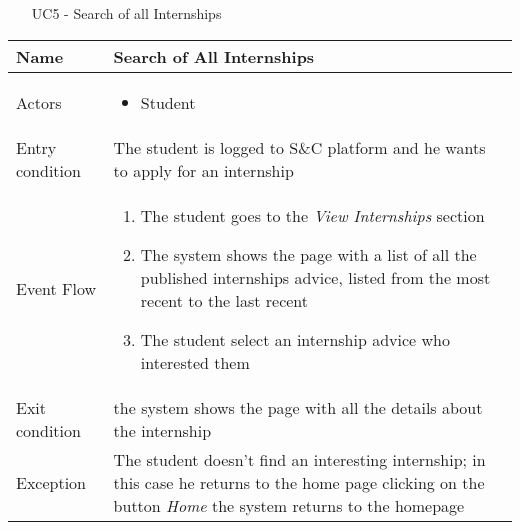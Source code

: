 				\begin{table} [H]
					\centering
					\begin{itemize}
						\item [UC5] - Search of all Internships
					\end{itemize}
					\begin{tabular}{|| P{7.5cm} | P{7.5cm} ||}
						\hline
						Name & Search of All Internships \\
						\hline
						Actors & \parbox{5cm}{\begin{itemize}
								\item Student
							\end{itemize}
						} \\
						\hline
						Entry condition & The student is logged to S\&C platform and he wants to apply for an internship  \\
						\hline
						Event Flow & \parbox{5cm}{\begin{enumerate}
								\item The student goes to the \textit{View 
									Internships} section
								\item The system shows the page with a 
								list of all the published internships advice, 
								listed from the most recent to the 
								last recent  
								\item The student select an internship advice who interested them
						\end{enumerate}} \\
						\hline 
						Exit condition &  the system shows the 
						page with all the details about the 
						internship \\
						\hline
						Exception & The student doesn’t find an interesting 
						internship; in this case he returns to the 
						home page clicking on the button \textit{Home}
						the system returns to the homepage 
						 \\
						\hline
					\end{tabular}
				\end{table}
				
				
				
